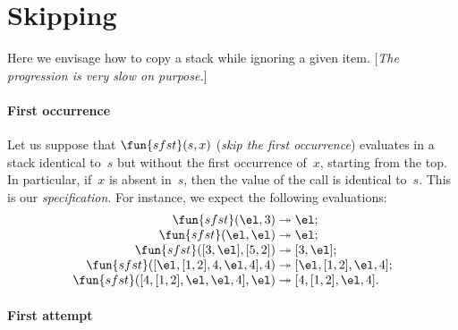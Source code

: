 \section{Skipping}
\label{sec:skipping}

Here we envisage how to copy a stack while ignoring a given
item. [\emph{The progression is very slow on purpose.}]

\paragraph{First occurrence}
\label{def:linear_search}

Let us suppose that \(\fun{sfst}(s,x)\)
(\emph{skip the first occurrence}) evaluates in a stack identical
to~\(s\) but without the first occurrence of~\(x\), starting from the
top. In particular, if~\(x\) is absent in~\(s\), then the value of the
call is identical to~\(s\). This is our
\emph{specification}. For instance, we expect the
following evaluations:\label{sfst_ex}
\begin{equation*}
\begin{array}{r@{\;}l@{\;}l}
\fun{sfst}(\el,3) & \twoheadrightarrow & \el;\\
\fun{sfst}(\el,\el) & \twoheadrightarrow & \el;\\
\fun{sfst}([3,\el],[5,2]) & \twoheadrightarrow & [3,\el];\\
\fun{sfst}([\el,[1,2],4,\el,4],4) & \twoheadrightarrow &
  [\el,[1,2],\el,4];\\
\fun{sfst}([4,[1,2],\el,\el,4],\el)
 & \twoheadrightarrow & [4,[1,2],\el,4].
\end{array}
\end{equation*}

\paragraph{First attempt}

